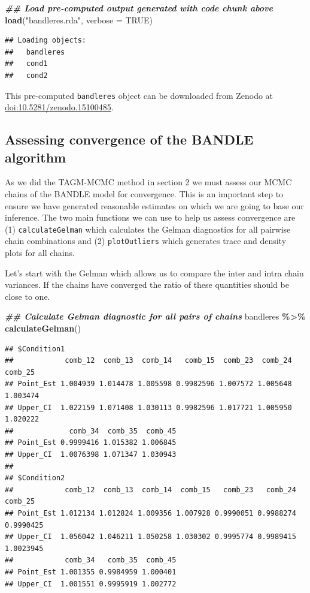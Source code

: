 \documentclass[9pt,a4paper,]{extarticle}
\newenvironment{Shaded}{\begin{snugshade}}{\end{snugshade}}
\newcommand{\AttributeTok}[1]{\textcolor[rgb]{0.13,0.29,0.53}{#1}}
\newcommand{\ConstantTok}[1]{\textcolor[rgb]{0.56,0.35,0.01}{#1}}
\newcommand{\DocumentationTok}[1]{\textcolor[rgb]{0.56,0.35,0.01}{\textbf{\textit{#1}}}}
\newcommand{\FunctionTok}[1]{\textcolor[rgb]{0.13,0.29,0.53}{\textbf{#1}}}
\newcommand{\NormalTok}[1]{#1}
\newcommand{\SpecialCharTok}[1]{\textcolor[rgb]{0.81,0.36,0.00}{\textbf{#1}}}
\newcommand{\StringTok}[1]{\textcolor[rgb]{0.31,0.60,0.02}{#1}}
\begin{document}
\begin{Shaded}
\begin{Highlighting}[]
\DocumentationTok{\#\# Load pre{-}computed output generated with code chunk above}
\FunctionTok{load}\NormalTok{(}\StringTok{"bandleres.rda"}\NormalTok{, }\AttributeTok{verbose =} \ConstantTok{TRUE}\NormalTok{)}
\end{Highlighting}
\end{Shaded}

\begin{verbatim}
## Loading objects:
##   bandleres
##   cond1
##   cond2
\end{verbatim}

This pre-computed \texttt{bandleres} object can be downloaded from Zenodo at
\href{http://doi.org/10.5281/zenodo.15100485}{doi:10.5281/zenodo.15100485}.

\subsection{Assessing convergence of the BANDLE algorithm}\label{assessing-convergence-of-the-bandle-algorithm}

As we did the TAGM-MCMC method in section 2 we must assess our MCMC chains of
the BANDLE model for convergence. This is an important step to ensure we have
generated reasonable estimates on which we are going to base our inference. The
two main functions we can use to help us assess convergence are (1)
\texttt{calculateGelman} which calculates the Gelman diagnostics for all pairwise chain
combinations and (2) \texttt{plotOutliers} which generates trace and density plots for
all chains.

Let's start with the Gelman which allows us to compare the inter and intra chain
variances. If the chains have converged the ratio of these quantities should be
close to one.

\begin{Shaded}
\begin{Highlighting}[]
\DocumentationTok{\#\# Calculate Gelman diagnostic for all pairs of chains}
\NormalTok{bandleres }\SpecialCharTok{\%\textgreater{}\%}
  \FunctionTok{calculateGelman}\NormalTok{()}
\end{Highlighting}
\end{Shaded}

\begin{verbatim}
## $Condition1
##            comb_12  comb_13  comb_14   comb_15  comb_23  comb_24  comb_25
## Point_Est 1.004939 1.014478 1.005598 0.9982596 1.007572 1.005648 1.003474
## Upper_CI  1.022159 1.071408 1.030113 0.9982596 1.017721 1.005950 1.020222
##             comb_34  comb_35  comb_45
## Point_Est 0.9999416 1.015382 1.006845
## Upper_CI  1.0076398 1.071347 1.030943
## 
## $Condition2
##            comb_12  comb_13  comb_14  comb_15   comb_23   comb_24   comb_25
## Point_Est 1.012134 1.012824 1.009356 1.007928 0.9990051 0.9988274 0.9990425
## Upper_CI  1.056042 1.046211 1.050258 1.030302 0.9995774 0.9989415 1.0023945
##            comb_34   comb_35  comb_45
## Point_Est 1.001355 0.9984959 1.000401
## Upper_CI  1.001551 0.9995919 1.002772
\end{verbatim}
\end{document}
